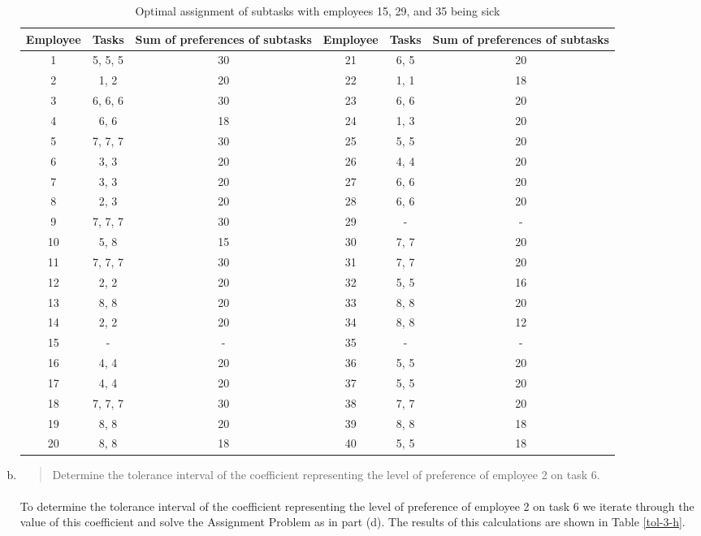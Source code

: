 \begin{enumerate}[(a)]
\begin{table}[H]
	\centering
	\caption{Optimal assignment of subtasks with employees 15, 29, and 35 being sick}
	\begin{tabular}{ccc||ccc}\hline
Employee & Tasks & Sum of preferences of subtasks & Employee & Tasks & Sum of preferences of subtasks \\ \hline
1 & 5, 5, 5 & 30 & 21 & 6, 5 & 20 \\
2 & 1, 2 & 20 & 22 & 1, 1 & 18 \\
3 & 6, 6, 6 & 30 & 23 & 6, 6 & 20 \\
4 & 6, 6 & 18 & 24 & 1, 3 & 20 \\
5 & 7, 7, 7 & 30 & 25 & 5, 5 & 20 \\
6 & 3, 3 & 20 & 26 & 4, 4 & 20 \\
7 & 3, 3 & 20 & 27 & 6, 6 & 20 \\
8 & 2, 3 & 20 & 28 & 6, 6 & 20 \\
9 & 7, 7, 7 & 30 & 29 & - & - \\
10 & 5, 8 & 15 & 30 & 7, 7 & 20 \\
11 & 7, 7, 7 & 30 & 31 & 7, 7 & 20 \\
12 & 2, 2 & 20 & 32 & 5, 5 & 16 \\
13 & 8, 8 & 20 & 33 & 8, 8 & 20 \\
14 & 2, 2 & 20 & 34 & 8, 8 & 12 \\
15 & - & - & 35 & - & - \\
16 & 4, 4 & 20 & 36 & 5, 5 & 20 \\
17 & 4, 4 & 20 & 37 & 5, 5 & 20 \\
18 & 7, 7, 7 & 30 & 38 & 7, 7 & 20 \\
19 & 8, 8 & 20 & 39 & 8, 8 & 18 \\
20 & 8, 8 & 18 & 40 & 5, 5 & 18 \\
\hline
	\end{tabular}
	\label{hungarian-3-g}
\end{table}

\item\begin{quote}Determine the tolerance interval of the coefficient representing the level of preference
of employee 2 on task 6.\end{quote}

	\paragraph{}
	To determine the tolerance interval of the coefficient representing the level of preference of employee 2 on task 6 we iterate through the value of this coefficient and solve the Assignment Problem as in part (d). The results of this calculations are shown in Table \ref{tol-3-h}.


\end{enumerate}
